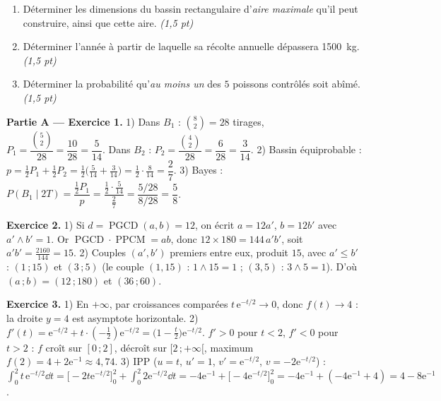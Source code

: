 \begin{enumerate}[label=\textbf{Tâche \arabic*.},leftmargin=2.4em]
\item Déterminer les dimensions du bassin rectangulaire d'\emph{aire maximale} qu'il peut
construire, ainsi que cette aire. \hfill\textit{(1,5 pt)}
\item Déterminer l'année à partir de laquelle sa récolte annuelle dépassera \SI{1500}{\kilogram}. \hfill\textit{(1,5 pt)}
\item Déterminer la probabilité qu'\emph{au moins un} des $5$ poissons contrôlés soit abîmé. \hfill\textit{(1,5 pt)}
\end{enumerate}
\par{}


\noindent\textbf{Partie A — Exercice 1.}
1) Dans $B_1$ : $\binom82=28$ tirages, $P_1=\dfrac{\binom52}{28}=\dfrac{10}{28}=\dfrac{5}{14}$.
Dans $B_2$ : $P_2=\dfrac{\binom42}{28}=\dfrac{6}{28}=\dfrac{3}{14}$.
2) Bassin équiprobable : $p=\frac12 P_1+\frac12 P_2=\frac12\big(\frac5{14}+\frac3{14}\big)=\frac12\cdot\frac8{14}=\dfrac{2}{7}$.
3) Bayes : $P(B_1\mid 2T)=\dfrac{\frac12 P_1}{p}=\dfrac{\frac12\cdot\frac5{14}}{\frac27}=\dfrac{5/28}{8/28}=\dfrac58$.

\noindent\textbf{Exercice 2.}
1) Si $d=\operatorname{PGCD}(a,b)=12$, on écrit $a=12a'$, $b=12b'$ avec $a'\wedge b'=1$.
Or $\operatorname{PGCD}\cdot\operatorname{PPCM}=ab$, donc $12\times180=144\,a'b'$, soit $a'b'=\frac{2160}{144}=15$.
2) Couples $(a',b')$ premiers entre eux, produit $15$, avec $a'\le b'$ : $(1\,;15)$ et $(3\,;5)$
(le couple $(1,15)$ : $1\wedge15=1$ ; $(3,5)$ : $3\wedge5=1$). D'où
$(a\,;b)=(12\,;180)$ et $(36\,;60)$.

\noindent\textbf{Exercice 3.}
1) En $+\infty$, par croissances comparées $t\,\mathrm{e}^{-t/2}\to0$, donc $f(t)\to4$ : la droite
$y=4$ est asymptote horizontale.
2) $f'(t)=\mathrm{e}^{-t/2}+t\cdot(-\tfrac12)\mathrm{e}^{-t/2}=\big(1-\tfrac{t}{2}\big)\mathrm{e}^{-t/2}$.
$f'>0$ pour $t<2$, $f'<0$ pour $t>2$ : $f$ croît sur $[0\,;2]$, décroît sur $[2\,;+\infty[$,
maximum $f(2)=4+2\mathrm{e}^{-1}\approx4{,}74$.
3) IPP ($u=t$, $u'=1$, $v'=\mathrm{e}^{-t/2}$, $v=-2\mathrm{e}^{-t/2}$) :
$\int_0^2 t\,\mathrm{e}^{-t/2}\dd t=\big[-2t\mathrm{e}^{-t/2}\big]_0^2+\int_0^2 2\mathrm{e}^{-t/2}\dd t
=-4\mathrm{e}^{-1}+\big[-4\mathrm{e}^{-t/2}\big]_0^2=-4\mathrm{e}^{-1}+(-4\mathrm{e}^{-1}+4)=4-8\mathrm{e}^{-1}$.

